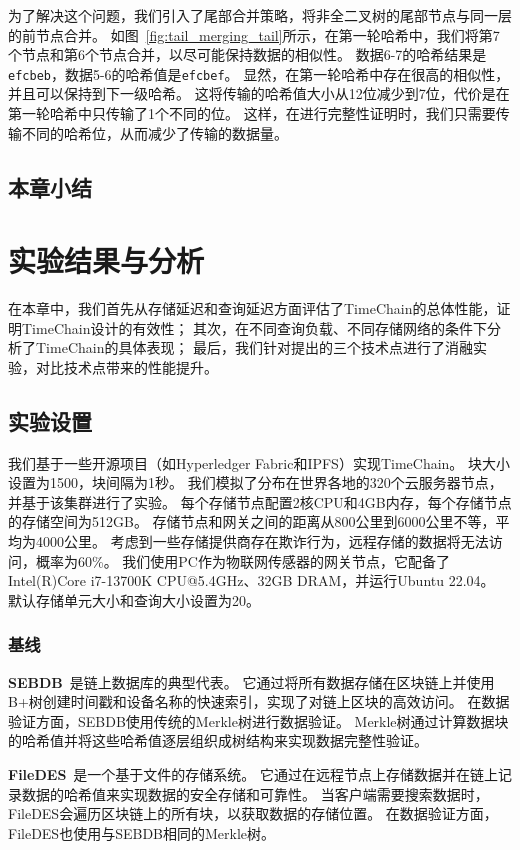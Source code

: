 为了解决这个问题，我们引入了尾部合并策略，将非全二叉树的尾部节点与同一层的前节点合并。
如图~\autoref{fig:tail_merging_tail}所示，在第一轮哈希中，我们将第7个节点和第6个节点合并，以尽可能保持数据的相似性。
数据6-7的哈希结果是\texttt{efcbeb}，数据5-6的哈希值是\texttt{efcbef}。
显然，在第一轮哈希中存在很高的相似性，并且可以保持到下一级哈希。
这将传输的哈希值大小从12位减少到7位，代价是在第一轮哈希中只传输了1个不同的位。
这样，在进行完整性证明时，我们只需要传输不同的哈希位，从而减少了传输的数据量。

\section{本章小结}

\chapter{实验结果与分析}
在本章中，我们首先从存储延迟和查询延迟方面评估了TimeChain的总体性能，证明TimeChain设计的有效性；
其次，在不同查询负载、不同存储网络的条件下分析了TimeChain的具体表现；
最后，我们针对提出的三个技术点进行了消融实验，对比技术点带来的性能提升。

\section{实验设置}
我们基于一些开源项目（如Hyperledger Fabric和IPFS）实现TimeChain。
块大小设置为1500，块间隔为1秒。
我们模拟了分布在世界各地的320个云服务器节点，并基于该集群进行了实验。
每个存储节点配置2核CPU和4GB内存，每个存储节点的存储空间为512GB。
存储节点和网关之间的距离从800公里到6000公里不等，平均为4000公里。
考虑到一些存储提供商存在欺诈行为，远程存储的数据将无法访问，概率为60\%。
我们使用PC作为物联网传感器的网关节点，它配备了Intel(R)Core i7-13700K CPU@5.4GHz、32GB DRAM，并运行Ubuntu 22.04。
默认存储单元大小和查询大小设置为20。

\subsection{基线}
\textbf{SEBDB}~\cite{zhu2019sebdb}是链上数据库的典型代表。
它通过将所有数据存储在区块链上并使用B+树创建时间戳和设备名称的快速索引，实现了对链上区块的高效访问。
在数据验证方面，SEBDB使用传统的Merkle树进行数据验证。
Merkle树通过计算数据块的哈希值并将这些哈希值逐层组织成树结构来实现数据完整性验证。

\textbf{FileDES}~\cite{xu2024filedes}是一个基于文件的存储系统。
它通过在远程节点上存储数据并在链上记录数据的哈希值来实现数据的安全存储和可靠性。
当客户端需要搜索数据时，FileDES会遍历区块链上的所有块，以获取数据的存储位置。
在数据验证方面，FileDES也使用与SEBDB相同的Merkle树。

